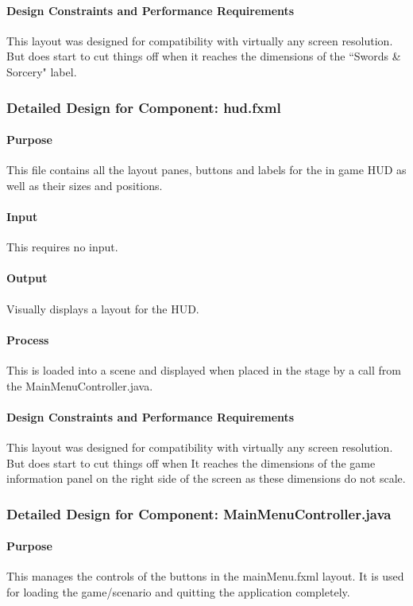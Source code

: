 \documentclass[12pt,a4paper,titlepage]{article}
\begin{document}
\paragraph{Design Constraints and Performance Requirements}	This layout was designed for compatibility with virtually any screen resolution.  But does start to cut things off when it reaches the dimensions of the ``Swords \& Sorcery" label.

\subsubsection{Detailed Design for Component: hud.fxml}
\paragraph{Purpose} This file contains all the layout panes, buttons and labels for the in game HUD as well as their sizes and positions.
\paragraph{Input} This requires no input.
\paragraph{Output} Visually displays a layout for the HUD.
\paragraph{Process} This is loaded into a scene and displayed when placed in the stage by a call from the MainMenuController.java.
\paragraph{Design Constraints and Performance Requirements}	This layout was designed for compatibility with virtually any screen resolution.  But does start to cut things off when It reaches the dimensions of the game information panel on the right side of the screen as these dimensions do not scale.

\subsubsection{Detailed Design for Component: MainMenuController.java}
\paragraph{Purpose} This manages the controls of the buttons in the mainMenu.fxml layout.  It is used for loading the game/scenario and quitting the application completely.
\end{document}
